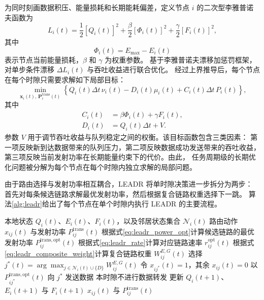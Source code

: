 为同时刻画数据积压、能量损耗和长期能耗偏差，定义节点 $i$ 的二次型李雅普诺夫函数为
\begin{equation}
L_i(t)=  
\frac{1}{2}[Q_i(t)]^2  
+\frac{\beta}{2}[\Phi_i(t)]^2  
+\frac{\gamma}{2}[F_i(t)]^2,  
\end{equation}
其中
\begin{equation}
\Phi_i(t)=E_{\max}-E_i(t)  
\end{equation}
表示节点当前能量损耗，$\beta$ 和 $\gamma$ 为权重参数。
基于李雅普诺夫漂移加惩罚框架，对单步条件漂移 $\Delta L_i(t)$ 与吞吐收益进行联合优化。
经过上界推导后，每个节点在每个时隙只需要求解如下局部目标：
\begin{equation}
\min_{\mathbf{x}_i(t),\,\mathbf{P}_i^{\mathrm{trans}}(t)}
\left\{
Q_i(t)\Delta t\,\nu_i(t)
-D_i(t)\mu_i(t)
+C_i(t)\Delta t\,P_i(t)
\right\},  
\end{equation}
其中
\begin{align}
C_i(t) &= \beta\Phi_i(t)+\gamma F_i(t),\\
D_i(t) &= Q_i(t)\Delta t+V.
\end{align}
参数 $V$ 用于调节吞吐收益与队列稳定之间的权衡。该目标函数包含三类因素：
第一项反映新到达数据带来的队列压力，第二项反映数据成功发送带来的吞吐收益，
第三项反映当前发射功率在长期能量约束下的代价。由此，
任务周期级的长期优化问题被分解为每个节点在每个时隙内独立求解的局部问题。

由于路由选择与发射功率相互耦合，LEADR 将单时隙决策进一步拆分为两步：
首先对每条候选链路求解最优发射功率，然后根据复合链路权重选择下一跳。
算法\ref{alg:leadr}给出了每个节点在单个时隙内执行 LEADR 的主要流程。

\begin{algorithm}[!htbp]
\caption{LEADR 分布式路由与功率联合决策}
\label{alg:leadr}
\renewcommand{\algorithmicrequire}{\textbf{输入：}}
\renewcommand{\algorithmicensure}{\textbf{输出：}}
\small
\begin{algorithmic}[1]
\REQUIRE 本地状态 $Q_i(t)$、$E_i(t)$、$F_i(t)$，以及邻居状态集合 $\mathcal{N}_i(t)$
\ENSURE 路由动作 $x_{ij}(t)$ 与发射功率 $P_{ij}^{\mathrm{trans}}(t)$
    \STATE 根据式\eqref{eq:leadr_power_opt}计算候选链路的最优发射功率 $P_{ij}^{\mathrm{trans,opt}}(t)$
    \STATE 根据式\eqref{eq:leadr_rate}计算对应链路速率 $r_{ij}^{\mathrm{opt}}(t)$
    \STATE 根据式\eqref{eq:leadr_composite_weight}计算复合链路权重 $W_{ij}^{E,G}(t)$
\ENDFOR
\STATE 选择 $j^{*}(t)=\arg\max_{j\in\mathcal{N}_i(t)\cup\{D\}}W_{ij}^{E,G}(t)$
    \STATE 令 $x_{ij^{*}}(t)=1$，其余 $x_{ij}(t)=0$
    \STATE 以 $P_{ij^{*}}^{\mathrm{trans,opt}}(t)$ 向 $j^{*}$ 发送数据
\ELSE
    \STATE 本时隙不进行数据转发
\ENDIF
\STATE 更新 $Q_i(t+1)$、$E_i(t+1)$ 与 $F_i(t+1)$
\RETURN $x_{ij}(t)$ 与 $P_{ij}^{\mathrm{trans}}(t)$
\end{algorithmic}
\end{algorithm}

